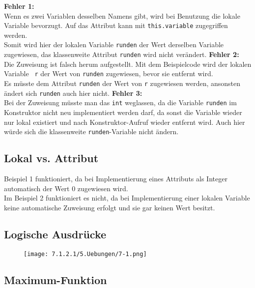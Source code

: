 \documentclass{scrartcl}   %
\begin{document}
\begin{itemize}
    \barrow \textbf{Fehler 1:}\\
    Wenn es zwei Variablen desselben Namens gibt, wird bei Benutzung die lokale Variable bevorzugt. Auf das Attribut kann mit \texttt{this.variable} zugegriffen werden.\\
    Somit wird hier der lokalen Variable \texttt{runden} der Wert derselben Variable zugewiesen, das klassenweite Attribut \texttt{runden} wird nicht verändert.
    \barrow \textbf{Fehler 2:}\\
    Die Zuweisung ist falsch herum aufgestellt. Mit dem Beispielcode wird der lokalen Variable \texttt{ r} der Wert von \texttt{runden} zugewiesen, bevor sie entfernt wird.\\
    Es müsste dem Attribut \texttt{runden} der Wert von \texttt{r} zugewiesen werden, ansonsten ändert sich \texttt{runden} auch hier nicht.
    \barrow \textbf{Fehler 3:}\\
    Bei der Zuweisung müsste man das \texttt{int} weglassen, da die Variable \texttt{runden} im Konstruktor nicht neu implementiert werden darf, da sonst die Variable wieder nur lokal existiert und nach Konstruktor-Aufruf wieder entfernt wird. Auch hier würde sich die klassenweite \texttt{runden}-Variable nicht ändern.
\end{itemize}

\subsection{Lokal vs. Attribut}

Beispiel 1 funktioniert, da bei Implementierung eines Attributs als Integer automatisch der Wert 0 zugewiesen wird.\\
Im Beispiel 2 funktioniert es nicht, da bei Implementierung einer lokalen Variable keine automatische Zuweisung erfolgt und sie gar keinen Wert besitzt.

\newpage

\subsection{Logische Ausdrücke}

\begin{figure}[ht]
	\centering
	\texttt{[image: 7.1.2.1/5.Uebungen/7-1.png]}
\end{figure}

\subsection{Maximum-Funktion}
\end{document}

